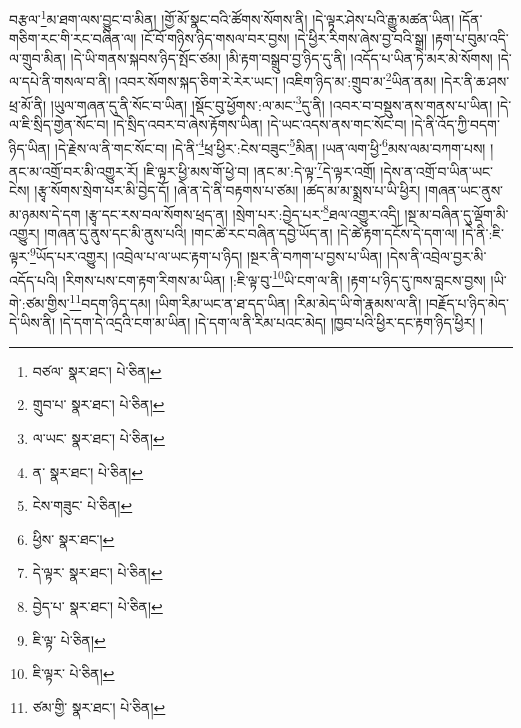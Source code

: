 བརྩལ་\footnote{བཙལ་  སྣར་ཐང་།  པེ་ཅིན། }མ་ཐག་ལས་བྱུང་བ་མིན། །གྱོ་མོ་སྣང་བའི་ཚོགས་སོགས་ནི། །དེ་ལྟར་ཤེས་པའི་རྒྱུ་མཚན་ཡིན། །དོན་གཅིག་རང་གི་རང་བཞིན་ལ། །ངོ་བོ་གཉིས་ཉིད་གསལ་བར་བྱས། །དེ་ཕྱིར་རིགས་ཞེས་བྱ་བའི་སྒྲ། །རྟག་པ་བུམ་འདི་ལ་གྲུབ་མིན། །དེ་ཡི་གནས་སྐབས་ཉིད་སྤོང་ཙམ། །མི་རྟག་བསྒྲུབ་བྱ་ཉིད་དུ་ནི། །འདོད་པ་ཡིན་ཏེ་མར་མེ་སོགས། །དེ་ལ་དཔེ་ནི་གསལ་བ་ནི། །འབར་སོགས་སྐད་ཅིག་རེ་རེར་ཡང་། །འཇིག་ཉིད་མ་:གྲུབ་མ་\footnote{གྲུབ་པ་  སྣར་ཐང་།  པེ་ཅིན། }ཡིན་ནམ། །དེར་ནི་ཆ་ཤས་ཕྲ་མོ་ནི། །ཡུལ་གཞན་དུ་ནི་སོང་བ་ཡིན། །སྡོང་བུ་ཕྱོགས་:ལ་མང་\footnote{ལ་ཡང་  སྣར་ཐང་།  པེ་ཅིན། }དུ་ནི། །འབར་བ་བསྡུས་ནས་གནས་པ་ཡིན། །དེ་ལ་ཇི་སྲིད་གྱེན་སོང་བ། །དེ་སྲིད་འབར་བ་ཞེས་རྟོགས་ཡིན། །དེ་ཡང་འདས་ནས་གང་སོང་བ། །དེ་ནི་འོད་ཀྱི་བདག་ཉིད་ཡིན། །དེ་རྗེས་ལ་ནི་གང་སོང་བ། །དེ་ནི་\footnote{ན་  སྣར་ཐང་།  པེ་ཅིན། }ཕྲ་ཕྱིར་:ངེས་བཟུང་\footnote{ངེས་གཟུང་  པེ་ཅིན། }མིན། །ཡན་ལག་ཕྱི་\footnote{ཕྱིས་  སྣར་ཐང་། }མས་ལམ་བཀག་པས། །ནང་མ་འགྲོ་བར་མི་འགྱུར་རོ། །ཇི་ལྟར་ཕྱི་མས་གོ་ཕྱེ་བ། །ནང་མ་:དེ་ལྟ་\footnote{དེ་ལྟར་  སྣར་ཐང་།  པེ་ཅིན། }དེ་ལྟར་འགྲོ། །དེས་ན་འགྲོ་བ་ཡིན་ཡང་ངེས། །རྩྭ་སོགས་སྲེག་པར་མི་བྱེད་དོ། །ཞེ་ན་དེ་ནི་བརྟགས་པ་ཙམ། །ཚད་མ་མ་སྨྲས་པ་ཡི་ཕྱིར། །གཞན་ཡང་ནུས་མ་ཉམས་དེ་དག །རྩྭ་དང་རས་བལ་སོགས་ཕྲད་ན། །སྲེག་པར་:བྱེད་པར་\footnote{བྱེད་པ་  སྣར་ཐང་།  པེ་ཅིན། }ཐལ་འགྱུར་འདི། །སྔ་མ་བཞིན་དུ་ལྡོག་མི་འགྱུར། །གཞན་དུ་ནུས་དང་མི་ནུས་པའི། །གང་ཚེ་རང་བཞིན་དབྱེ་ཡོད་ན། །དེ་ཚེ་རྟག་དངོས་དེ་དག་ལ། །དེ་ནི་:ཇི་ལྟར་\footnote{ཇི་ལྟ་  པེ་ཅིན། }ཡོད་པར་འགྱུར། །འབྲེལ་པ་ལ་ཡང་རྟག་པ་ཉིད། །སྔར་ནི་བཀག་པ་བྱས་པ་ཡིན། །དེས་ནི་འབྲེལ་བྱར་མི་འདོད་པའི། །རིགས་པས་ངག་རྟག་རིགས་མ་ཡིན། །:ཇི་ལྟ་བུ་\footnote{ཇི་ལྟར་  པེ་ཅིན། }ཡི་ངག་ལ་ནི། །རྟག་པ་ཉིད་དུ་ཁས་བླངས་བྱས། །ཡི་གེ་:ཙམ་གྱིས་\footnote{ཙམ་གྱི་  སྣར་ཐང་།  པེ་ཅིན། }བདག་ཉིད་དམ། །ཡིག་རིམ་ཡང་ན་ཐ་དད་ཡིན། །རིམ་མེད་ཡི་གེ་རྣམས་ལ་ནི། །བརྗོད་པ་ཉིད་མེད་དེ་ཡིས་ནི། །དེ་དག་དེ་འདྲའི་ངག་མ་ཡིན། །དེ་དག་ལ་ནི་རིམ་པའང་མེད། །ཁྱབ་པའི་ཕྱིར་དང་རྟག་ཉིད་ཕྱིར། །
